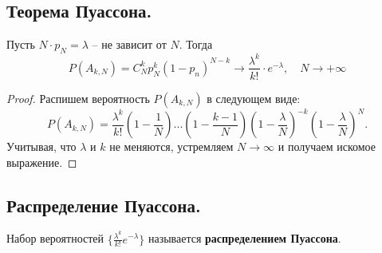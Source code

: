 \subsection{Теорема Пуассона.}
\begin{theorem}
    Пусть $N \cdot p_N = \lambda$ -- не зависит от $N$. Тогда
    \[
        P(A_{k, N}) = C_N^k p_N^k (1 - p_n)^{N - k} \to \frac{\lambda^k}{k!} \cdot e^{-\lambda},
        \quad
        N \to +\infty
    \]
    \begin{proof}
        Распишем вероятность $P(A_{k, N})$ в следующем виде:
        \[
            P(A_{k, N}) = \frac{\lambda^k}{k!}
            \left( 1 - \frac{1}{N} \right)
            ...
            \left( 1 - \frac{k-1}{N} \right)
            \left( 1 - \frac{\lambda}{N} \right)^{-k}
            \left( 1 - \frac{\lambda}{N} \right)^{N}.
        \]
        Учитывая, что $\lambda$ и $k$ не меняются, устремляем $N \to \infty$ и получаем искомое выражение.
    \end{proof}
\end{theorem}

\subsection{Распределение Пуассона.}
\begin{definition}
    Набор вероятностей $\{ \frac{\lambda^k}{k!} e^{-\lambda} \}$ называется \textbf{распределением Пуассона}.
\end{definition}
\newpage

